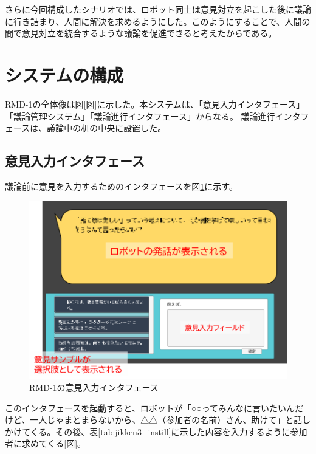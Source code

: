 \documentclass[11pt, a4paper]{jreport} %
\begin{document}
さらに今回構成したシナリオでは、ロボット同士は意見対立を起こした後に議論に行き詰まり、人間に解決を求めるようにした。このようにすることで、人間の間で意見対立を統合するような議論を促進できると考えたからである。





\section{システムの構成}
\label{sec:システム3}

RMD-1の全体像は図[図]に示した。本システムは、「意見入力インタフェース」「議論管理システム」「議論進行インタフェース」からなる。
議論進行インタフェースは、議論中の机の中央に設置した。


\subsection{意見入力インタフェース}
議論前に意見を入力するためのインタフェースを図\ref{fig:RMD-1}に示す。
\begin{figure}[htbp]
\begin{center}
\includegraphics[width=150mm]{images/RMD-1inter}
\caption{RMD-1の意見入力インタフェース}
\label{fig:RMD-1}
\end{center}
\end{figure}



このインタフェースを起動すると、ロボットが「○○ってみんなに言いたいんだけど、一人じゃまとまらないから、△△（参加者の名前）さん、助けて」と話しかけてくる。その後、表\ref{tab:jikken3_instill}に示した内容を入力するように参加者に求めてくる[図]。
\end{document}

